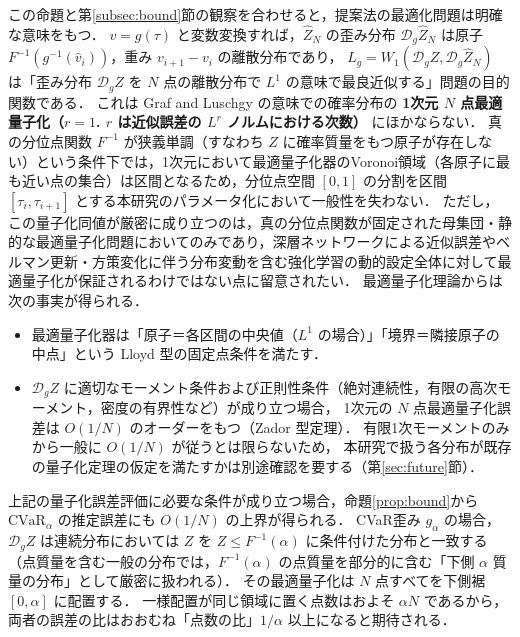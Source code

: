 \documentclass[a4paper,10pt]{jsarticle}
\theoremstyle{definition}
\newcommand{\CVaR}{\mathrm{CVaR}}
\newcommand{\Wone}{W_1}
\newcommand{\Finv}{F^{-1}}
\newcommand{\dist}{\mathcal{D}_g}
\begin{document}
この命題と第\ref{subsec:bound}節の観察を合わせると，提案法の最適化問題は明確な意味をもつ．
$v=g(\tau)$ と変数変換すれば，$\hat Z_N$ の歪み分布 $\dist\hat Z_N$ は原子 $\Finv(g^{-1}(\hat v_i))$，重み $v_{i+1}-v_i$ の離散分布であり，
$L_g=\Wone(\dist Z,\dist\hat Z_N)$ は「歪み分布 $\dist Z$ を $N$ 点の離散分布で $L^1$ の意味で最良近似する」問題の目的関数である．
これは Graf and Luschgy \cite{graf2000quantization} の意味での確率分布の \textbf{1次元 $N$ 点最適量子化（$r=1$. $r$ は近似誤差の $L^r$ ノルムにおける次数）} にほかならない．
真の分位点関数 $\Finv$ が狭義単調（すなわち $Z$ に確率質量をもつ原子が存在しない）という条件下では，1次元において最適量子化器のVoronoi領域（各原子に最も近い点の集合）は区間となるため，分位点空間 $[0,1]$ の分割を区間 $[\tau_i,\tau_{i+1}]$ とする本研究のパラメータ化において一般性を失わない．
ただし，この量子化同値が厳密に成り立つのは，真の分位点関数が固定された母集団・静的な最適量子化問題においてのみであり，深層ネットワークによる近似誤差やベルマン更新・方策変化に伴う分布変動を含む強化学習の動的設定全体に対して最適量子化が保証されるわけではない点に留意されたい．
最適量子化理論からは次の事実が得られる．
\begin{itemize}
  \item 最適量子化器は「原子＝各区間の中央値（$L^1$ の場合）」「境界＝隣接原子の中点」という Lloyd 型の固定点条件を満たす．
  \item $\dist Z$ に適切なモーメント条件および正則性条件（絶対連続性，有限の高次モーメント，密度の有界性など）が成り立つ場合，
  1次元の $N$ 点最適量子化誤差は $O(1/N)$ のオーダーをもつ（Zador 型定理）．
  有限1次モーメントのみから一般に $O(1/N)$ が従うとは限らないため，
  本研究で扱う各分布が既存の量子化定理の仮定を満たすかは別途確認を要する（第\ref{sec:future}節）．
\end{itemize}
上記の量子化誤差評価に必要な条件が成り立つ場合，命題\ref{prop:bound}から $\CVaR_\alpha$ の推定誤差にも $O(1/N)$ の上界が得られる．
CVaR歪み $g_\alpha$ の場合，$\dist Z$ は連続分布においては $Z$ を $Z\le\Finv(\alpha)$ に条件付けた分布と一致する（点質量を含む一般の分布では，$\Finv(\alpha)$ の点質量を部分的に含む「下側 $\alpha$ 質量の分布」として厳密に扱われる）．
その最適量子化は $N$ 点すべてを下側裾 $[0,\alpha]$ に配置する．
一様配置が同じ領域に置く点数はおよそ $\alpha N$ であるから，
両者の誤差の比はおおむね「点数の比」$1/\alpha$ 以上になると期待される．
\end{document}
